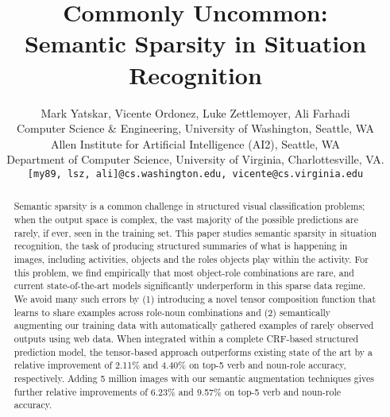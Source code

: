 \documentclass[10pt,twocolumn,letterpaper]{article}
\begin{document}
\title{Commonly Uncommon:\\Semantic Sparsity in Situation Recognition}

\author{Mark Yatskar,  Vicente Ordonez, Luke Zettlemoyer, Ali Farhadi \\
        Computer Science \& Engineering, University of Washington, Seattle, WA\\
        Allen Institute for Artificial Intelligence (AI2), Seattle, WA\\
        Department of Computer Science, University of Virginia, Charlottesville, VA. \\
	    {\tt [my89, lsz, ali]@cs.washington.edu, vicente@cs.virginia.edu}
  }


\maketitle


\begin{abstract}
Semantic sparsity is a common challenge in structured visual classification problems; when the output space is complex, the vast majority of the possible predictions are rarely, if ever, seen in the training set. 
This paper studies semantic sparsity in situation recognition, the task of producing structured summaries of what is happening in images, including activities, objects and the roles objects play within the activity. 
For this problem, we find empirically that most object-role combinations are rare, and current state-of-the-art models significantly underperform in this sparse data regime.
We avoid many such errors by (1) introducing a novel tensor composition function that learns to share examples across role-noun combinations and (2) semantically augmenting our training data with automatically gathered examples of rarely observed outputs using web data.
When integrated within a complete CRF-based structured prediction model, the tensor-based approach outperforms existing state of the art by a relative improvement of 2.11\%  and 4.40\% on top-5 verb and noun-role accuracy, respectively.
Adding 5 million images with our semantic augmentation techniques gives further relative improvements of 6.23\% and 9.57\% on top-5 verb and noun-role accuracy.
\end{abstract} 
\end{document}
